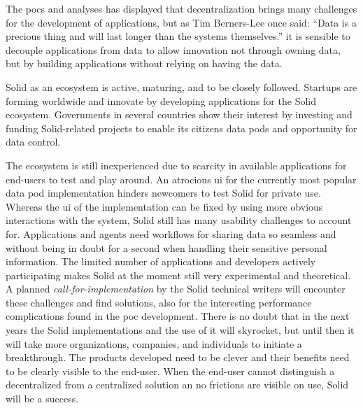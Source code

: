 The \glspl{poc} and analyses has displayed that decentralization brings many challenges for the development of applications, but as Tim Berners-Lee once said: “Data is a precious thing and will last longer than the systems themselves.” it is sensible to decouple applications from data to allow innovation not through owning data, but by building applications without relying on having the data.

\vspace{0.5cm}

Solid as an ecosystem is active, maturing, and to be closely followed. Startups are forming worldwide and innovate by developing applications for the Solid ecosystem. Governments in several countries show their interest by investing and funding Solid-related projects to enable its citizens data pods and opportunity for data control. 

The ecosystem is still inexperienced due to scarcity in available applications for end-users to test and play around. An atrocious \gls{ui} for the currently most popular data pod implementation hinders newcomers to test Solid for private use. Whereas the \gls{ui} of the implementation can be fixed by using more obvious interactions with the system, Solid still has many usability challenges to account for. Applications and agents need workflows for sharing data so seamless and without being in doubt for a second when handling their sensitive personal information. The limited number of applications and developers actively participating makes Solid at the moment still very experimental and theoretical. A planned \textit{call-for-implementation} by the Solid technical writers will encounter these challenges and find solutions, also for the interesting performance complications found in the \gls{poc} development. There is no doubt that in the next years the Solid implementations and the use of it will skyrocket, but until then it will take more organizations, companies, and individuals to initiate a breakthrough. The products developed need to be clever and their benefits need to be clearly visible to the end-user. When the end-user cannot distinguish a decentralized from a centralized solution an no frictions are visible on use, Solid will be a success.



